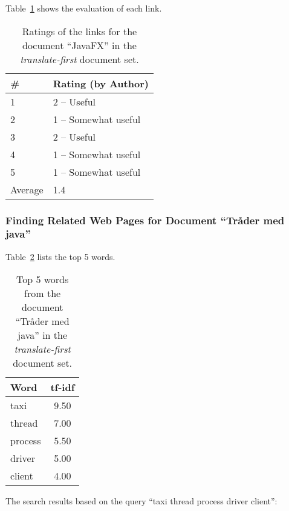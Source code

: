 Table~\ref{tab:ratings-en-javafx} shows the evaluation of each link.
\begin{table}[H]
\centering
\begin{tabular}{|l|l|}
\hline\hline
    \# & Rating (by Author) \\
\hline
    1 & 2 -- Useful \\
    2 & 1 -- Somewhat useful \\
    3 & 2 -- Useful \\
    4 & 1 -- Somewhat useful \\
    5 & 1 -- Somewhat useful \\
\hline
    Average & 1.4 \\
\hline\hline
\end{tabular}
\caption{Ratings of the links for the document ``JavaFX'' in the \textit{translate-first} document set.}
\label{tab:ratings-en-javafx}
\end{table}



\subsubsection{Finding Related Web Pages for Document ``Tråder med java''}
\label{subsubsec:en-tr-der-med-java}

Table~\ref{tab:topWords-en-tr-der-med-java} lists the top 5 words.
\begin{table}[H]
\centering
\begin{tabular}{|l|c|}
\hline\hline
    Word & tf-idf \\
\hline
    taxi & 9.50 \\
    thread & 7.00 \\
    process & 5.50 \\
    driver & 5.00 \\
    client & 4.00 \\
\hline\hline
\end{tabular}
\caption{Top 5 words from the document ``Tråder med java'' in the \textit{translate-first} document set.}
\label{tab:topWords-en-tr-der-med-java}
\end{table}

The search results based on the query ``taxi thread process driver client'':

